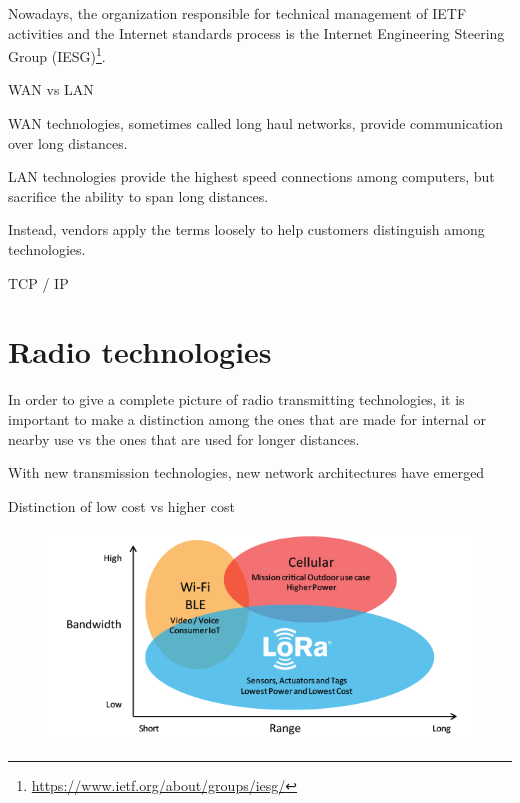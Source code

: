 	
	Nowadays, the organization responsible for technical management of IETF activities and the Internet standards process is the Internet Engineering Steering Group (IESG)\footnote{\url{https://www.ietf.org/about/groups/iesg/}}.
	
	\newpage
	
	WAN vs LAN
	
	WAN technologies, sometimes called long haul networks, provide communication
	over long distances.
	
	LAN technologies provide the highest speed connections among computers, but
	sacrifice the ability to span long distances.
	
	Instead, vendors apply the terms loosely to help customers distinguish among technologies.

	TCP / IP

\section{Radio technologies}\label{sec:section_two}
	
	In order to give a complete picture of radio transmitting technologies, it is important to make a distinction among the ones that are made for internal or nearby use vs the ones that are used for longer distances.
	
	
	With new transmission technologies, new network architectures have emerged
	
	
	Distinction of low cost vs higher cost
	
	\begin{figure}
		\centering
		\includegraphics[width=\textwidth]{resources/img/LoRa_Why_Range}
		\caption{}
	\end{figure}
	
